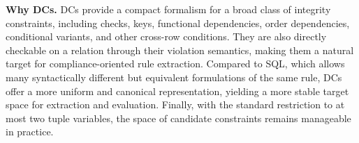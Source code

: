 \smallskip\noindent\textbf{Why DCs.}
DCs provide a compact formalism for a broad class of integrity constraints, including checks, keys, functional dependencies, order dependencies, conditional variants, and other cross-row conditions. They are also directly checkable on a relation through their violation semantics, making them a natural target for compliance-oriented rule extraction. Compared to SQL, which allows many syntactically different but equivalent formulations of the same rule, DCs offer a more uniform and canonical representation, yielding a more stable target space for extraction and evaluation. Finally, with the standard restriction to at most two tuple variables, the space of candidate constraints remains manageable in practice.







%
